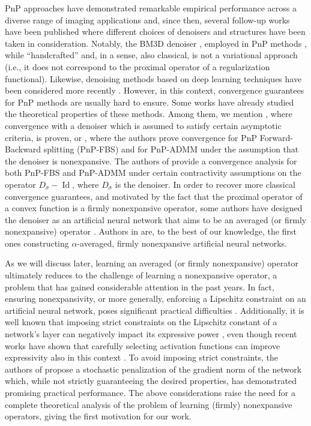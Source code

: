 \documentclass[onefignum,onetabnum]{siamonline250211}
\newcommand{\Id}{\operatorname{Id}}
\begin{document}
PnP approaches have demonstrated remarkable empirical performance across a diverse range of imaging applications \cite{buzz,dong,sree,teod,venkat2013} and, since then, several follow-up works have been published where different choices of denoisers and structures have been taken in consideration. Notably, the BM3D denoiser \cite{dabov,heide,sree}, employed in PnP methods \cite{pnpreview}, while ``handcrafted'' and, in a sense, also classical, is not a variational approach (i.e., it does not correspond to the proximal operator of a regularization functional). Likewise, denoising methods based on deep learning techniques have been considered more recently \cite{he,mein,zhang}. However, in this context, convergence guarantees for PnP methods are usually hard to ensure. Some works have already studied the theoretical properties of these methods. Among them, we mention \cite{chan}, where convergence with a denoiser which is assumed to satisfy certain asymptotic criteria, is proven, or \cite{sree,teod17}, where the authors prove convergence for PnP Forward-Backward splitting (PnP-FBS) and for PnP-ADMM under the assumption that the denoiser is nonexpansive. The authors of \cite{ryupnp2019} provide a convergence analysis for both PnP-FBS and PnP-ADMM under certain contractivity assumptions on the operator $D_\sigma-\Id$, where $D_\sigma$ is the denoiser. In order to recover more classical convergence guarantees, and motivated by the fact that the proximal operator of a convex function is a firmly nonexpansive operator, some authors have designed the denoiser as an artificial neural network that aims to be an averaged (or firmly nonexpansive) operator \cite{steidl2021,pescterr2021,celledoni23,Terris2020}. Authors in \cite{steidl2021} are, to the best of our knowledge, the first ones constructing  $\alpha$-averaged, firmly nonexpansive artificial neural networks. 

As we will discuss later, learning an averaged (or firmly nonexpansive) operator ultimately reduces to the challenge of learning a nonexpansive operator, a problem that has gained considerable attention in the past years. In fact, ensuring nonexpansivity, or more generally, enforcing a Lipschitz constraint on an artificial neural network, poses significant practical difficulties \cite{pescterr2021}. Additionally, it is well known that imposing strict constraints on the Lipschitz constant of a network's layer can negatively impact its expressive power \cite{Anil2019,Lanthaler2024,Tanielian2021,zhang2022}, even though recent works have shown that carefully selecting activation functions can improve expressivity also in this context \cite{ducotterd2024,Neumayer2023}. To avoid imposing strict constraints, the authors of \cite{pescterr2021} propose a stochastic penalization of the gradient norm of the network which, while not strictly guaranteeing the desired properties, has demonstrated promising practical performance. The above considerations raise the need for a complete theoretical analysis of the problem of learning (firmly) nonexpansive operators, giving the first motivation for our work.
\end{document}
